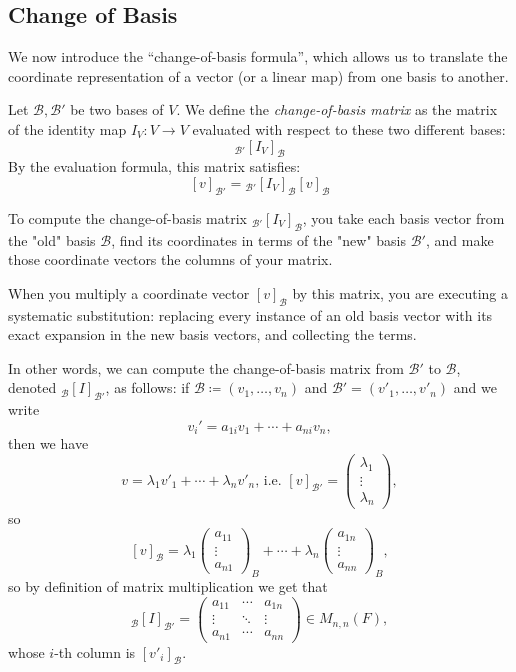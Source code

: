 \documentclass[../linear_algebra_and_groups.tex]{subfiles}
\begin{document}
\subsection{Change of Basis}

We now introduce the ``change-of-basis formula'', which allows us to translate the coordinate representation of a vector (or a linear map) from one basis to another.

Let $\mathcal{B}, \mathcal{B}'$ be two bases of $V$. We define the \textit{change-of-basis matrix} as the matrix of the identity map $I_V : V \to V$ evaluated with respect to these two different bases:
\[ {}_{\mathcal{B}'}[I_V]_\mathcal{B} \]
By the evaluation formula, this matrix satisfies:
\[ [v]_{\mathcal{B}'} = {}_{\mathcal{B}'}[I_V]_\mathcal{B} [v]_\mathcal{B} \]

\begin{remark}
    To compute the change-of-basis matrix ${}_{\mathcal{B}'}[I_V]_\mathcal{B}$, you take each basis vector from the "old" basis $\mathcal{B}$, find its coordinates in terms of the "new" basis $\mathcal{B}'$, and make those coordinate vectors the columns of your matrix. 
    
    When you multiply a coordinate vector $[v]_\mathcal{B}$ by this matrix, you are executing a systematic substitution: replacing every instance of an old basis vector with its exact expansion in the new basis vectors, and collecting the terms.
\end{remark}
In other words, we can compute the change-of-basis matrix from $\mathcal{B}'$ to $\mathcal{B}$, denoted ${}_{\mathcal{B}}[I]_{\mathcal{B}'}$, as follows: if $\mathcal{B}\coloneqq(v_1,\dots,v_n)$ and $\mathcal{B}'=(v'_1,\dots,v'_n)$ and we write \[v_i'=a_{1i}v_1+\cdots+a_{ni}v_n,\]
then we have \[v=\lambda_1v'_1+\cdots+\lambda_nv'_n,\,\text{i.e. }[v]_{\mathcal{B}'}=\begin{pmatrix}\lambda_1\\\vdots\\\lambda_n\end{pmatrix},\]
so \[[v]_{\mathcal{B}}=\lambda_1\begin{pmatrix}a_{11}\\\vdots\\a_{n1}\end{pmatrix}_B+\cdots+\lambda_n\begin{pmatrix}a_{1n}\\\vdots\\a_{nn}\end{pmatrix}_B,\]
so by definition of matrix multiplication we get that \[{}_\mathcal{B}[I]_{\mathcal{B}'}=\begin{pmatrix}a_{11} & \cdots & a_{1n}\\\vdots & \ddots & \vdots \\ a_{n1} & \cdots & a_{nn}\end{pmatrix}\in M_{n,n}(F),\]
whose $i$-th column is $[v'_i]_\mathcal{B}$.
\end{document}
